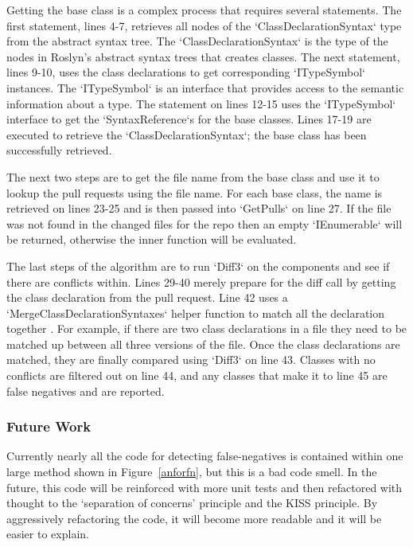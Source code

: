\documentclass[draftclsnofoot,onecolumn]{IEEEtran}
\begin{document}
Getting the base class is a complex process that requires several statements. 
The first statement, lines 4-7, retrieves all nodes of the  
`ClassDeclarationSyntax` type from the abstract syntax tree. The 
`ClassDeclarationSyntax` is the type of the nodes in Roslyn’s abstract syntax 
trees that creates classes. The next statement, lines 9-10, uses the class 
declarations to get corresponding `ITypeSymbol` instances. The `ITypeSymbol` is 
an interface that provides access to the semantic information about a type. The 
statement on lines 12-15 uses the `ITypeSymbol` interface to get the 
`SyntaxReference`s for the base classes. Lines 17-19 are executed to retrieve 
the `ClassDeclarationSyntax`; the base class has been successfully retrieved.

The next two steps are to get the file name from the base class and use it to 
lookup the pull requests using the file name. For each base class, the name is 
retrieved on lines 23-25 and is then passed into `GetPulls` on line 27. If the 
file was not found in the changed files for the repo then an empty 
`IEnumerable` will be returned, otherwise the inner function will be evaluated.

The last steps of the algorithm are to run `Diff3` on the components and see if 
there are conflicts within. Lines 29-40 merely prepare for the diff call by 
getting the class declaration from the pull request. Line 42 uses a 
`MergeClassDeclarationSyntaxes` helper function to match all the declaration 
together . For example, if there are two class declarations in a file they need 
to be matched up between all three versions of the file. Once the class 
declarations are matched, they are finally compared using `Diff3` on line 43. 
Classes with no conflicts are filtered out on line 44, and any classes that 
make it to line 45 are false negatives and are reported.

\subsubsection{Future Work}

Currently nearly all the code for detecting false-negatives is contained within 
one large method shown in Figure~\ref{anforfn}, but this is a bad code smell. 
In the future, this code will be reinforced with more unit tests and then 
refactored with thought to the ‘separation of concerns’ principle and the KISS 
principle. By aggressively refactoring the code, it will become more readable 
and it will be easier to explain.
\end{document}
